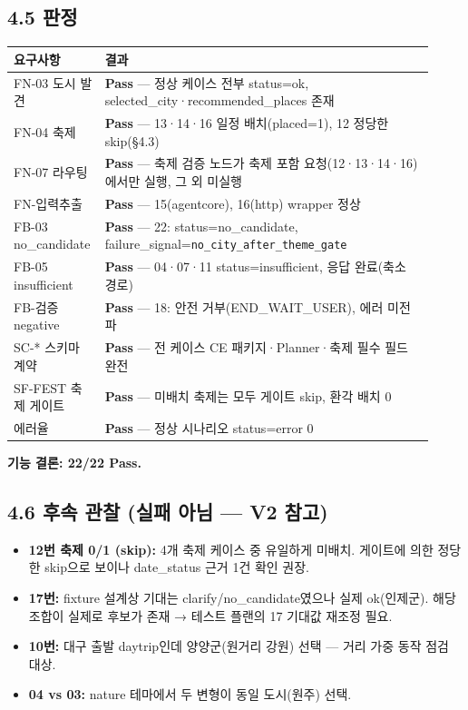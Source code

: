 \documentclass[11pt,a4paper]{article}
\newcommand{\DocNeedspace}[1]{\par\ifdim\dimexpr\pagegoal-\pagetotal\relax<#1\newpage\fi}
\providecommand{\tightlist}{\setlength{\itemsep}{0pt}\setlength{\parskip}{0pt}}
\begin{document}
\DocNeedspace{6\baselineskip}
\subsection*{4.5 판정}

\begin{small}
\begin{longtable}{@{}>{\RaggedRight\arraybackslash}m{0.160\linewidth}>{\RaggedRight\arraybackslash}m{0.760\linewidth}@{}}
\toprule\noalign{}
요구사항 & 결과 \\
\midrule\noalign{}
\endhead
\bottomrule\noalign{}
\endlastfoot
FN-03 도시 발견 & \textbf{Pass} --- 정상 케이스 전부 status=ok, selected\_city·recommended\_places 존재 \\
FN-04 축제 & \textbf{Pass} --- 13·14·16 일정 배치(placed=1), 12 정당한 skip(§4.3) \\
FN-07 라우팅 & \textbf{Pass} --- 축제 검증 노드가 축제 포함 요청(12·13·14·16)에서만 실행, 그 외 미실행 \\
FN-입력추출 & \textbf{Pass} --- 15(agentcore), 16(http) wrapper 정상 \\
FB-03 no\_candidate & \textbf{Pass} --- 22: status=no\_candidate, failure\_signal=\texttt{no\_\allowbreak{}city\_\allowbreak{}after\_\allowbreak{}theme\_\allowbreak{}gate} \\
FB-05 insufficient & \textbf{Pass} --- 04·07·11 status=insufficient, 응답 완료(축소 경로) \\
FB-검증 negative & \textbf{Pass} --- 18: 안전 거부(END\_WAIT\_USER), 에러 미전파 \\
SC-* 스키마 계약 & \textbf{Pass} --- 전 케이스 CE 패키지·Planner·축제 필수 필드 완전 \\
SF-FEST 축제 게이트 & \textbf{Pass} --- 미배치 축제는 모두 게이트 skip, 환각 배치 0 \\
에러율 & \textbf{Pass} --- 정상 시나리오 status=error 0 \\
\end{longtable}
\end{small}

\textbf{기능 결론: 22/22 Pass.}

\DocNeedspace{6\baselineskip}
\subsection*{4.6 후속 관찰 (실패 아님 --- V2 참고)}

\begin{itemize}
\tightlist
\item
  \textbf{12번 축제 0/1 (skip):} 4개 축제 케이스 중 유일하게 미배치. 게이트에 의한 정당한 skip으로 보이나 date\_status 근거 1건 확인 권장.
\item
  \textbf{17번:} fixture 설계상 기대는 clarify/no\_candidate였으나 실제 ok(인제군). 해당 조합이 실제로 후보가 존재 → 테스트 플랜의 17 기대값 재조정 필요.
\item
  \textbf{10번:} 대구 출발 daytrip인데 양양군(원거리 강원) 선택 --- 거리 가중 동작 점검 대상.
\item
  \textbf{04 vs 03:} nature 테마에서 두 변형이 동일 도시(원주) 선택.
\end{itemize}
\end{document}
